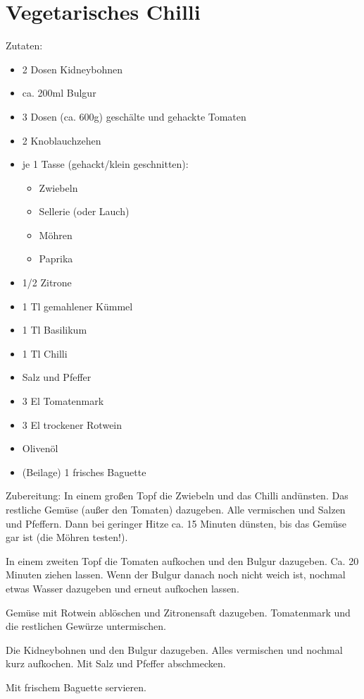 \section{Vegetarisches Chilli}
Zutaten:
\begin{itemize}
    \item 2 Dosen Kidneybohnen
    \item ca. 200ml Bulgur
    \item 3 Dosen (ca. 600g) geschälte und gehackte Tomaten
    \item 2 Knoblauchzehen
    \item je 1 Tasse (gehackt/klein geschnitten):
        \begin{itemize}
            \item Zwiebeln
            \item Sellerie (oder Lauch)
            \item Möhren
            \item Paprika
        \end{itemize}
    \item 1/2 Zitrone
    \item 1 Tl gemahlener Kümmel
    \item 1 Tl Basilikum
    \item 1 Tl Chilli
    \item Salz und Pfeffer
    \item 3 El Tomatenmark
    \item 3 El trockener Rotwein
    \item Olivenöl
    \item (Beilage) 1 frisches Baguette
\end{itemize}

Zubereitung:
In einem großen Topf die Zwiebeln und das Chilli andünsten. Das restliche Gemüse (außer den Tomaten) dazugeben. Alle vermischen und Salzen und Pfeffern. Dann bei geringer Hitze ca. 15 Minuten dünsten, bis das Gemüse gar ist (die Möhren testen!).

In einem zweiten Topf die Tomaten aufkochen und den Bulgur dazugeben. Ca. 20 Minuten ziehen lassen. Wenn der Bulgur danach noch nicht weich  ist, nochmal etwas Wasser dazugeben und erneut aufkochen lassen.

Gemüse mit Rotwein ablöschen und Zitronensaft dazugeben. Tomatenmark und die restlichen Gewürze untermischen.

Die Kidneybohnen und den Bulgur dazugeben. Alles vermischen und nochmal kurz aufkochen. Mit Salz und Pfeffer abschmecken.

Mit frischem Baguette servieren.

\newpage
\mbox{}
\vfill
\begin{center}
\end{center}
\vfill
\mbox{ }
\newpage
